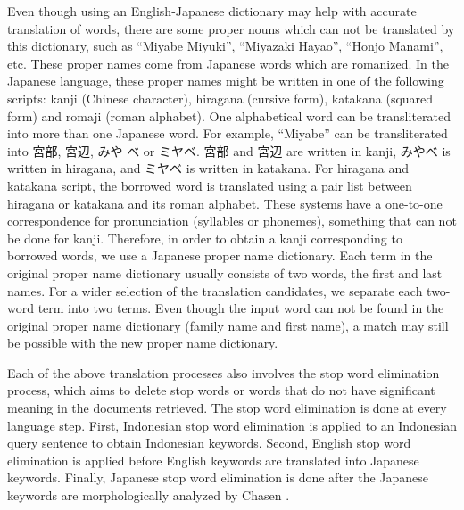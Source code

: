 \documentclass[english]{jnlp_1.3c}
\begin{document}
Even though using an English-Japanese dictionary may help with accurate 
translation of words, there are some proper nouns which can not be 
translated by this dictionary, such as ``Miyabe Miyuki'', 
``Miyazaki Hayao'', ``Honjo Manami'', etc.  These proper names 
come from Japanese words which are romanized. In the 
Japanese language, these proper names might be written
in one of the following scripts: kanji (Chinese character), hiragana
(cursive form), katakana (squared form) and romaji (roman alphabet). One
alphabetical word can be transliterated into more than one Japanese
word. For example, ``Miyabe'' can be transliterated into 宮部, 宮辺, みや
べ or ミヤベ. 宮部 and 宮辺 are written in kanji, みやべ is written in
hiragana, and ミヤベ is written in katakana. For hiragana and katakana
script, the borrowed word is translated using a pair list between
hiragana or katakana and its roman alphabet. These systems have a
one-to-one correspondence for pronunciation (syllables or phonemes),
something that can not be done for kanji. Therefore, in order to obtain
a kanji corresponding to borrowed words, we use a Japanese proper name
dictionary. Each term in the original proper name dictionary usually
consists of two words, the first and last names. For a wider selection
of the translation candidates, we separate each two-word term into two
terms. Even though the input word can not be found in the original
proper name dictionary (family name and first name), a match may still
be possible with the new proper name dictionary.  

Each of the above
translation processes also involves the stop word elimination process,
which aims to delete stop words or words that do not have significant
meaning in the documents retrieved. The stop word elimination is done at
every language step. First, Indonesian stop word elimination is applied
to an Indonesian query sentence to obtain Indonesian keywords. Second,
English stop word elimination is applied before English keywords are
translated into Japanese keywords.  Finally, Japanese stop word
elimination is done after the Japanese keywords are morphologically
analyzed by Chasen \cite{chasen}.
\end{document}
